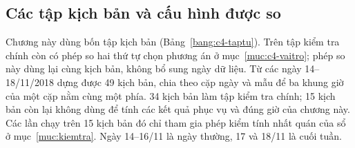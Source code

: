 \subsection{Các tập kịch bản và cấu hình được so}
\label{muc:c4-taptu}

Chương này dùng bốn tập kịch bản (Bảng~\ref{bang:c4-taptu}). Trên tập kiểm tra chính còn có phép so hai
thứ tự chọn phương án ở mục~\ref{muc:c4-vaitro}; phép so này dùng lại cùng kịch bản, không bổ sung ngày dữ liệu. Từ các ngày 14--18/11/2018 dựng được 49 kịch bản, chia
theo cặp ngày và mẫu để ba khung giờ của một cặp nằm cùng một phía. 34 kịch bản làm tập kiểm tra chính; 15 kịch bản
còn lại không dùng để tính các kết quả phục vụ và đúng giờ của chương này. Các lần chạy trên 15 kịch bản đó chỉ tham
gia phép kiểm tính nhất quán của sổ ở mục~\ref{muc:kiemtra}. Ngày 14--16/11 là ngày thường, 17 và 18/11 là cuối tuần.

